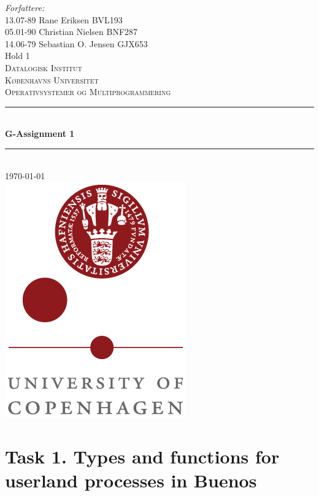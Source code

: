 \documentclass[a4paper,12pt,danish]{report}
\begin{document}
\begin{titlepage}

\newcommand{\HRule}{\rule{\linewidth}{0.4mm}}
\center
\small{ \emph{Forfattere:}\\
13.07-89 Rane Eriksen \textsc{BVL193}
\\
05.01-90 Christian Nielsen \textsc{BNF287}
\\
14.06-79 Sebastian O. Jensen \textsc{GJX653}
\\
Hold 1} \\[2cm]

\textsc{\LARGE Datalogisk Institut}\\[0.5cm]
\textsc{\large Københavns Universitet}\\[1.5cm]
\textsc{\large Operativsystemer og Multiprogrammering}\\
\HRule \\[0.7cm]
{\huge \bfseries G-Assignment 1}\\[0.4cm]
\HRule \\[1.5cm]
\textsc{\Large \textsc{\today}}\\[0.5cm]

\includegraphics[scale=0.5]{ku_logo.png}\\[1cm]

\end{titlepage}
\tableofcontents
\newpage
\renewcommand{\thesection}{\arabic{section}}
\renewcommand{\thempfootnote}{\arabic{mpfootnote}}
\renewcommand\thesubsection{}
\newcommand{\minus}[1]{{#1}^{-}}
\section{Task 1. Types and functions for userland processes in Buenos}
\end{document}
